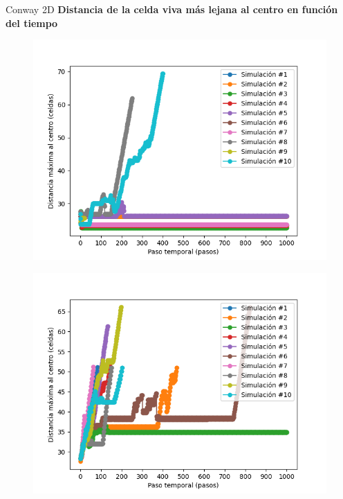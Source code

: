 \begin{frame}{Conway 2D}
    \textbf{Distancia de la celda viva más lejana al centro en función del tiempo}
    \begin{multicols}{2}
        {
            \begin{figure}[H]
                \centering
                \includegraphics[width=0.8\linewidth]{pic/conway2d/distance_i10}
                \label{fig:conway2d:distance:i10}
            \end{figure}
        }


        {
            \begin{figure}[H]
                \centering
                \includegraphics[width=0.8\linewidth]{pic/conway2d/distance_i90}
                \label{fig:conway2d:distance:i90}
            \end{figure}
        }
    \end{multicols}
\end{frame}

